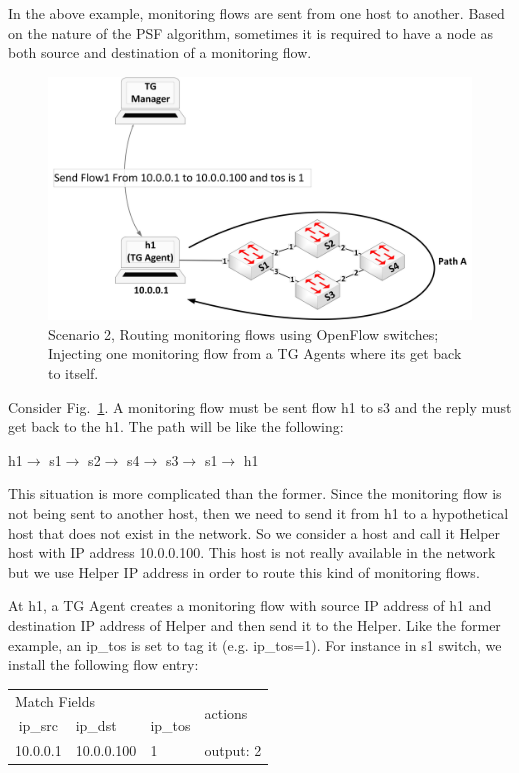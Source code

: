 \documentclass[10pt, journal, letterpaper]{IEEEtran}
\begin{document}
In the above example, monitoring flows are sent from one host to another. Based on the nature of the PSF algorithm, sometimes it is required to have a node as both source and destination of a monitoring flow. 
\begin{figure}
    \centering
    \includegraphics[width=\columnwidth]{img/Injection_of_flows_2.png}
    \caption{Scenario 2, Routing monitoring flows using OpenFlow switches; Injecting one monitoring flow from a TG Agents where its get back to itself.}
    \label{fig:Injection of flows 2}
\end{figure}

Consider Fig.~\ref{fig:Injection of flows 2}. A monitoring flow must be sent flow h1 to s3 and the reply must get back to the h1. The path will be like the following:

h1$\rightarrow$ s1$\rightarrow$ s2$\rightarrow$ s4$\rightarrow$ s3$\rightarrow$ s1$\rightarrow$ h1

This situation is more complicated than the former. Since the monitoring flow is not being sent to another host, then we need to send it from h1 to a hypothetical host that does not exist in the network. So we consider a host and call it Helper host with IP address 10.0.0.100. This host is not really available in the network but we use Helper IP address in order to route this kind of monitoring flows.

At h1, a TG Agent creates a monitoring flow with source IP address of h1 and destination IP address of Helper and then send it to the Helper. Like the former example, an ip\_tos is set to tag it (e.g. ip\_tos=1). For instance in s1 switch, we install the following flow entry:

\begin{table}[ht]
\centering
\begin{tabular}{|c|l|l||l|}
\hline
\multicolumn{3}{|l||}{Match Fields} & \multirow{2}{*}{actions} \\ \cline{1-3} \cline{1-3}
ip\_src  & ip\_dst    & ip\_tos &    \\ \hline
10.0.0.1 & 10.0.0.100 & 1       & output: 2  \\ \hline
\end{tabular}
\end{table}
\end{document}
